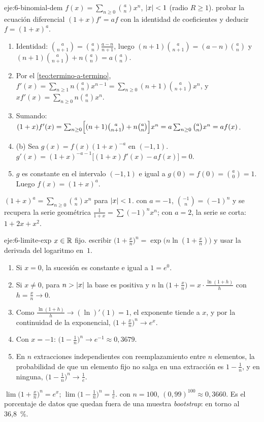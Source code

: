 \begin{solucion}{eje:6-binomial-dem}
\datos $f(x)=\sum_{n\ge0}\binom anx^{n}$, $\lvert x\rvert<1$ (radio $R\ge1$).
\planteamiento probar la ecuación diferencial $(1+x)f'=af$ con la identidad de coeficientes y deducir $f=(1+x)^{a}$.
\pasos
\begin{enumerate}[label=\arabic*.]
  \item Identidad: $\binom{a}{n+1}=\binom an\frac{a-n}{n+1}$, luego $(n+1)\binom{a}{n+1}=(a-n)\binom an$ y $(n+1)\binom{a}{n+1}+n\binom an=a\binom an$.
  \item Por el \cref{teo:termino-a-termino}, $f'(x)=\sum_{n\ge1}n\binom anx^{n-1}=\sum_{n\ge0}(n+1)\binom{a}{n+1}x^{n}$, y $xf'(x)=\sum_{n\ge0}n\binom anx^{n}$.
  \item Sumando: $(1+x)f'(x)=\sum_{n\ge0}\Bigl[(n+1)\binom{a}{n+1}+n\binom an\Bigr]x^{n}=a\sum_{n\ge0}\binom anx^{n}=af(x)$.
  \item (b) Sea $g(x)=f(x)(1+x)^{-a}$ en $(-1,1)$. $g'(x)=(1+x)^{-a-1}\bigl[(1+x)f'(x)-af(x)\bigr]=0$.
  \item $g$ es constante en el intervalo $(-1,1)$ e igual a $g(0)=f(0)=\binom a0=1$. Luego $f(x)=(1+x)^{a}$.
\end{enumerate}
\resultado $(1+x)^{a}=\sum_{n\ge0}\binom anx^{n}$ para $\lvert x\rvert<1$.
\comprobacion con $a=-1$, $\binom{-1}{n}=(-1)^{n}$ y se recupera la serie geométrica $\frac{1}{1+x}=\sum(-1)^{n}x^{n}$; con $a=2$, la serie se corta: $1+2x+x^{2}$.
\end{solucion}

\begin{solucion}{eje:6-limite-exp}
\datos $x\in\mathbb{R}$ fijo.
\planteamiento escribir $\bigl(1+\frac xn\bigr)^{n}=\exp\bigl(n\ln(1+\frac xn)\bigr)$ y usar la derivada del logaritmo en~$1$.
\pasos
\begin{enumerate}[label=\arabic*.]
  \item Si $x=0$, la sucesión es constante e igual a $1=e^{0}$.
  \item Si $x\neq0$, para $n>\lvert x\rvert$ la base es positiva y $n\ln\bigl(1+\frac xn\bigr)=x\cdot\frac{\ln(1+h)}{h}$ con $h=\frac xn\to0$.
  \item Como $\frac{\ln(1+h)}{h}\to(\ln)'(1)=1$, el exponente tiende a $x$, y por la continuidad de la exponencial, $\bigl(1+\frac xn\bigr)^{n}\to e^{x}$.
  \item Con $x=-1$: $\bigl(1-\frac1n\bigr)^{n}\to e^{-1}\approx0{,}3679$.
  \item En $n$ extracciones independientes con reemplazamiento entre $n$ elementos, la probabilidad de que un elemento fijo no salga en una extracción es $1-\frac1n$, y en ninguna, $\bigl(1-\frac1n\bigr)^{n}\to\frac1e$.
\end{enumerate}
\resultado $\lim\bigl(1+\frac xn\bigr)^{n}=e^{x}$; $\lim\bigl(1-\frac1n\bigr)^{n}=\frac1e$.
\comprobacion con $n=100$, $(0{,}99)^{100}\approx0{,}3660$. Es el porcentaje de datos que quedan fuera de una muestra \emph{bootstrap}: en torno al 36,8~\%.
\end{solucion}

